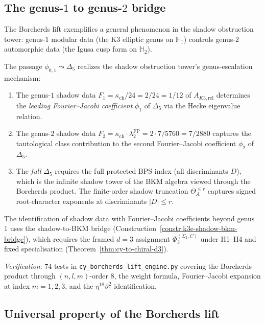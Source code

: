 \subsection{The genus-\texorpdfstring{$1$}{1} to genus-\texorpdfstring{$2$}{2} bridge}
\label{subsec:k3e-genus-bridge}

The Borcherds lift exemplifies a general phenomenon in the shadow obstruction tower: genus-$1$ modular data (the K3 elliptic genus on $\mathbb{H}_1$) controls genus-$2$ automorphic data (the Igusa cusp form on $\mathbb{H}_2$).

\begin{proposition}
\label{prop:k3e-genus-escalation}
The passage $\phi_{0,1} \leadsto \Delta_5$ realizes the shadow obstruction tower's genus-escalation mechanism:
\begin{enumerate}[label=(\roman*)]
 \item The genus-$1$ shadow data $F_1 = \kappa_{\mathrm{ch}} / 24 = 2/24 = 1/12$ of $A_{K3,\mathrm{rel}}$ determines the \emph{leading Fourier--Jacobi coefficient} $\phi_1$ of $\Delta_5$ via the Hecke eigenvalue relation.
 \item The genus-$2$ shadow data $F_2 = \kappa_{\mathrm{ch}} \cdot \lambda_2^{\mathrm{FP}} = 2 \cdot 7/5760 = 7/2880$ captures the tautological class contribution to the second Fourier--Jacobi coefficient $\phi_2$ of $\Delta_5$.
 \item The \emph{full} $\Delta_5$ requires the full protected BPS index (all discriminants $D$), which is the infinite shadow tower of the BKM algebra viewed through the Borcherds product. The finite-order shadow truncation $\Theta_A^{\leq r}$ captures signed root-character exponents at discriminants $|D| \leq r$.
\end{enumerate}
The identification of shadow data with Fourier--Jacobi coefficients beyond genus~$1$ uses the shadow-to-BKM bridge (Construction~\ref{constr:k3e-shadow-bkm-bridge}), which requires the framed $d = 3$ assignment $\Phi_3^{(\Sigma_2,C)}$ under H1--H4 and fixed specialisation (Theorem~\ref{thm:cy-to-chiral-d3}).
\end{proposition}

\noindent\textit{Verification}: 74 tests in \texttt{cy\_borcherds\_lift\_engine.py} covering the Borcherds product through $(n,l,m)$-order $8$, the weight formula, Fourier--Jacobi expansion at index $m = 1,2,3$, and the $\eta^{18}\vartheta_1^2$ identification.

\subsection{Universal property of the Borcherds lift}
\label{subsec:borcherds-lift-universal}

